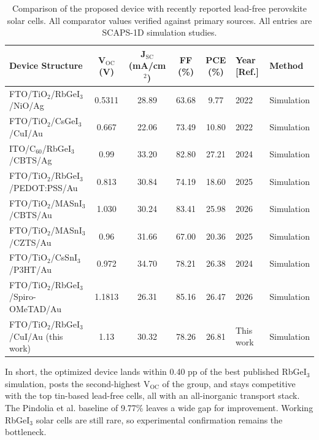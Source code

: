 \documentclass[review]{elsarticle}
\begin{document}
\begin{table}[htbp]
\centering
{\footnotesize\setlength{\tabcolsep}{3pt}
\begin{tabularx}{\textwidth}{XccccXX}
\hline
Device Structure & V$_{\mathrm{OC}}$ (V) & J$_{\mathrm{SC}}$ (mA/cm$^{2}$) & FF (\%) & PCE (\%) & Year [Ref.] & Method
\\\hline
FTO/\allowbreak{}TiO$_{2}$/RbGeI$_{3}$/NiO/\allowbreak{}Ag & 0.5311 & 28.89 & 63.68 & 9.77 & 2022 \cite{r14} & Simulation\\
FTO/\allowbreak{}TiO$_{2}$/CsGeI$_{3}$/CuI/\allowbreak{}Au & 0.667 & 22.06 & 73.49 & 10.80 & 2022 \cite{r24} & Simulation\\
ITO/\allowbreak{}C$_{60}$/RbGeI$_{3}$/CBTS/\allowbreak{}Ag & 0.99 & 33.20 & 82.80 & 27.21 & 2024 \cite{r22} & Simulation\\
FTO/\allowbreak{}TiO$_{2}$/RbGeI$_{3}$/PEDOT:PSS/\allowbreak{}Au & 0.813 & 30.84 & 74.19 & 18.60 & 2025 \cite{r39} & Simulation\\
FTO/\allowbreak{}TiO$_{2}$/MASnI$_{3}$/CBTS/\allowbreak{}Au & 1.030 & 30.24 & 83.41 & 25.98 & 2026 \cite{r41} & Simulation\\
FTO/\allowbreak{}TiO$_{2}$/MASnI$_{3}$/CZTS/Au & 0.96 & 31.66 & 67.00 & 20.36 & 2025 \cite{r42} & Simulation\\
FTO/\allowbreak{}TiO$_{2}$/CsSnI$_{3}$/P3HT/Au & 0.972 & 34.70 & 78.21 & 26.38 & 2024 \cite{r40} & Simulation\\
FTO/\allowbreak{}TiO$_{2}$/RbGeI$_{3}$/Spiro-OMeTAD/\allowbreak{}Au & 1.1813 & 26.31 & 85.16 & 26.47 & 2026 \cite{r23} & Simulation\\
FTO/\allowbreak{}TiO$_{2}$/RbGeI$_{3}$/CuI/\allowbreak{}Au (this work) & 1.13 & 30.32 & 78.26 & 26.81 & This work & Simulation\\
\hline
\end{tabularx}
}
\caption{Comparison of the proposed device with recently reported lead-free perovskite solar cells. All comparator values verified against primary sources. All entries are SCAPS-1D simulation studies.}
\end{table}
In short, the optimized device lands within 0.40 pp of the best published RbGeI$_{3}$ simulation, posts the second-highest V$_{\mathrm{OC}}$ of the group, and stays competitive with the top tin-based lead-free cells, all with an all-inorganic transport stack.
 The Pindolia et al. \cite{r14} baseline of 9.77\% leaves a wide gap for improvement. Working RbGeI$_{3}$ solar cells are still rare, so experimental confirmation remains the bottleneck.
\end{document}
